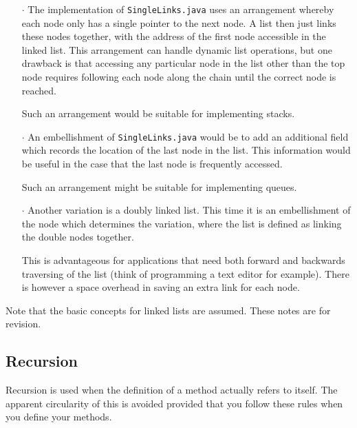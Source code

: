 \documentclass[twoside=false,DIV=14]{scrartcl}
\begin{document}
\begin{itemize}
\item[$\cdot$] The implementation of  {\tt SingleLinks.java} uses an arrangement whereby each node only has a single pointer to the next node. A list then just links these nodes together, with the address of the first node accessible in the linked list. This arrangement can handle dynamic list operations, but one drawback is that accessing any particular node in the list other than the top node requires following each node along the chain until the correct node is reached.

Such an arrangement  would be suitable for implementing stacks.

\item[$\cdot$] An embellishment of  {\tt SingleLinks.java}  would be to add an additional field which records the location of the last node in the list. This information would be useful in the case that the last node is frequently accessed.

Such an arrangement  might be suitable for implementing queues.

\item[$\cdot$]  Another variation is a doubly linked list. This time it is an embellishment of the node which determines the variation, where the list is defined as linking the double nodes together.

This is advantageous for applications that need both forward and backwards traversing of the list (think of programming a text editor for example). There is however a space overhead in saving an extra link for each node.
\end{itemize}


Note that the basic concepts for linked lists are assumed. These notes are for revision. 
\subsection*{Recursion}

Recursion is used when the definition of a method actually refers to itself. The apparent circularity of this is avoided provided that you follow these rules when you define your methods.
\end{document}
